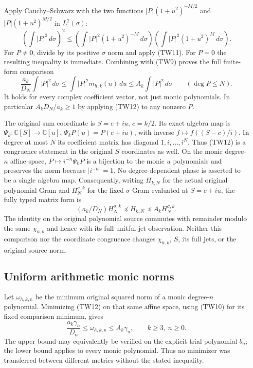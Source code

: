\documentclass[11pt,a4paper]{article}
\begin{document}
Apply Cauchy--Schwarz with the two functions
$|P|(1+u^2)^{-M/2}$ and $|P|(1+u^2)^{M/2}$ in $L^2(\sigma)$:
\[
 \left(\int|P|^2\,d\sigma\right)^2
 \leq\left(\int|P|^2(1+u^2)^{-M}\,d\sigma\right)
       \left(\int|P|^2(1+u^2)^M\,d\sigma\right).
\]
For $P\ne0$, divide by its positive $\sigma$ norm and apply (TW11).
For $P=0$ the resulting inequality is immediate.
Combining with (TW9) proves the full finite-form comparison
\[
 \boxed{
 \frac{a_k}{D_N}\int|P|^2\,d\sigma
 \leq\int|P|^2m_{h,k}(u)\,du
 \leq A_k\int|P|^2\,d\sigma
 \qquad(\deg P\leq N).}
 \tag{TW12}
\]
It holds for every complex coefficient vector, not just monic polynomials.
In particular $A_kD_N/a_k\geq1$ by applying (TW12) to any nonzero $P$.

The original sum coordinate is $S=c+iu$, $c=k/2$.  Its exact algebra
map is $\Psi_k:\mathbb C[S]\to\mathbb C[u]$,
$\Psi_k P(u)=P(c+iu)$, with inverse $f\mapsto f((S-c)/i)$.
In degree at most $N$ its coefficient matrix has diagonal
$1,i,\ldots,i^N$.  Thus (TW12) is a congruence statement in the
original $S$ coordinates as well.  On the monic degree-$n$ affine
space, $P\mapsto i^{-n}\Psi_kP$ is a bijection to the monic $u$
polynomials and preserves the norm because $|i^{-n}|=1$.
No degree-dependent phase is asserted to be a single algebra map.
Consequently, writing $H_{k,N}$ for the actual original polynomial
Gram and $H_{N}^{\sigma,k}$ for the fixed $\sigma$ Gram evaluated at
$S=c+iu$, the fully typed matrix form is
\[
 \boxed{(a_k/D_N)H_N^{\sigma,k}\preceq H_{k,N}
 \preceq A_kH_N^{\sigma,k}.}\tag{TW13}
\]
The identity on the original polynomial source commutes with remainder
modulo the same $\chi_{h,k}$ and hence with its full unitful jet
observation.  Neither this comparison nor the coordinate congruence
changes $\chi_{h,k}$, $S$, its full jets, or the original source norm.

\subsection{Uniform arithmetic monic norms}

Let $\omega_{h,k,n}$ be the minimum original squared norm of a monic
degree-$n$ polynomial.  Minimizing (TW12) on that same affine space,
using (TW10) for its fixed comparison minimum, gives
\[
 \boxed{\frac{a_k\gamma_n}{D_n}\leq\omega_{h,k,n}
 \leq A_k\gamma_n,\qquad k\geq3,\ n\geq0.}\tag{TW14}
\]
The upper bound may equivalently be verified on the explicit trial
polynomial $b_n$; the lower bound applies to every monic polynomial.
Thus no minimizer was transferred between different metrics without
the stated inequality.
\end{document}
